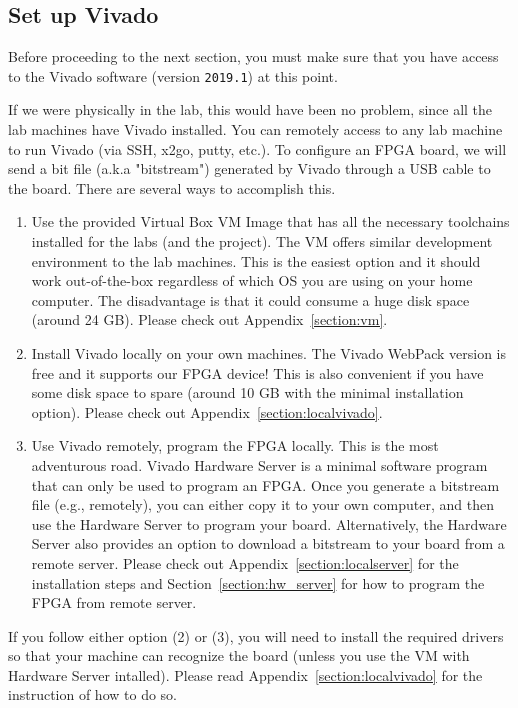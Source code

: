 \documentclass[11pt]{article}
\begin{document}
\subsection{Set up Vivado}

Before proceeding to the next section, you must make sure that you have access to the Vivado software (version \texttt{2019.1}) at this point.

If we were physically in the lab, this would have been no problem, since all the lab machines have Vivado installed. You can remotely access to any lab machine to run Vivado (via SSH, x2go, putty, etc.). To configure an FPGA board, we will send a bit file (a.k.a "bitstream") generated by Vivado through a USB cable to the board. There are several ways to accomplish this.

\begin{enumerate}
  \item Use the provided Virtual Box VM Image that has all the necessary toolchains installed for the labs (and the project). The VM offers similar development environment to the lab machines. This is the easiest option and it should work out-of-the-box regardless of which OS you are using on your home computer. The disadvantage is that it could consume a huge disk space (around 24 GB). Please check out Appendix~\ref{section:vm}.
  \item Install Vivado locally on your own machines. The Vivado WebPack version is free and it supports our FPGA device! This is also convenient if you have some disk space to spare (around 10 GB with the minimal installation option). Please check out Appendix~\ref{section:localvivado}.
  \item Use Vivado remotely, program the FPGA locally. This is the most adventurous road. Vivado Hardware Server is a minimal software program that can only be used to program an FPGA. Once you generate a bitstream file (e.g., remotely), you can either copy it to your own computer, and then use the Hardware Server to program your board. Alternatively, the Hardware Server also provides an option to download a bitstream to your board from a remote server. Please check out Appendix~\ref{section:localserver} for the installation steps and Section~\ref{section:hw_server} for how to program the FPGA from remote server.
\end{enumerate}

If you follow either option (2) or (3), you will need to install the required drivers so that your machine can recognize the board (unless you use the VM with Hardware Server intalled). Please read Appendix~\ref{section:localvivado} for the instruction of how to do so.
\end{document}
